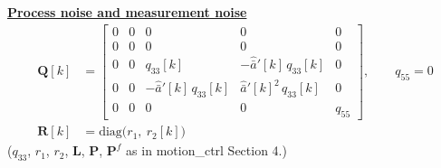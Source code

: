 \documentclass[11pt,a4paper]{ctexart}
\newcommand{\ba}{\bar{a}}
\newcommand{\hd}[1]{\par\bigskip\noindent\underline{\textbf{#1}}}
\begin{document}
\hd{Process noise and measurement noise}
\[
\begin{aligned}
\mathbf{Q}[k] &=
\begin{bmatrix}
0 & 0 & 0 & 0 & 0 \\
0 & 0 & 0 & 0 & 0 \\
0 & 0 & q_{33}[k] & -\hat{\ba}'[k]\,q_{33}[k] & 0 \\
0 & 0 & -\hat{\ba}'[k]\,q_{33}[k] & \hat{\ba}'[k]^{2}\,q_{33}[k] & 0 \\
0 & 0 & 0 & 0 & q_{55}
\end{bmatrix},
\qquad q_{55} = 0 \\
\mathbf{R}[k] &= \mathrm{diag}\big(r_1,\ r_2[k]\big)
\end{aligned}
\]
($q_{33}$, $r_1$, $r_2$, $\mathbf{L}$, $\mathbf{P}$, $\mathbf{P}^f$ as in motion\_ctrl Section 4.)
\end{document}
